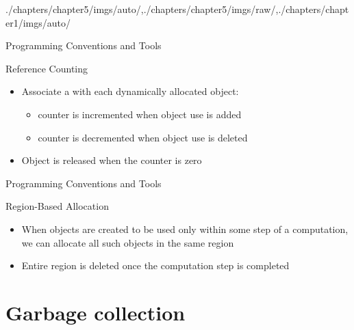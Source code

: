 \begin{graphicspathcontext}{{./chapters/chapter5/imgs/auto/},{./chapters/chapter5/imgs/raw/},{./chapters/chapter1/imgs/auto/}}
\begin{bibunit}[apalike]
\begin{frame}[t]{{Programming Conventions} and Tools \insertcontinuationtext}
	\begin{block}{Reference Counting}
		\begin{itemize}
			\item Associate a  with each dynamically allocated object: \begin{itemize}
				\item counter is incremented when object use is added
				\item counter is decremented when object use is deleted
			\end{itemize}
			\item Object is released when the counter is zero
		\end{itemize}
	\end{block}
	\vspace{.25cm}
\end{frame}

\begin{frame}{Programming Conventions and Tools \insertcontinuationtext}
	\begin{block}{Region-Based Allocation}
		\begin{itemize}
			\item When objects are created to be used only within some step of a computation, we can allocate all such objects in the same region
			\item Entire region is deleted once the computation step is completed
		\end{itemize}
	\end{block}
	\vspace{.25cm}
\end{frame}

\section{Garbage collection}
\sectiontableofcontentslide


\end{bibunit}
\end{graphicspathcontext}
